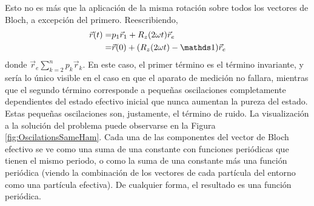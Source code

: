 Esto no es más que la aplicación de la misma rotación sobre todos los vectores de Bloch, a excepción del primero. Reescribiendo,
\begin{align*}
    \vec{r}(t)=&p_{1}\vec{r}_{1}+R_{z}(2\omega t)\vec{r}_{e}\\
    =&\vec{r}(0)+(R_{z}(2\omega t)-\Id)\vec{r}_{e}
\end{align*}
donde $\vec{r}_{e}\sum_{k=2}^{n}p_{k}\vec{r}_{k}$.
En este caso, el primer término es el término invariante, y sería lo único visible en el caso en que el aparato de medición no fallara, mientras que el segundo término corresponde a pequeñas oscilaciones completamente dependientes del estado efectivo inicial que nunca aumentan la pureza del estado. Estas pequeñas oscilaciones son, justamente, el término de ruido. La visualización a la solución del problema puede observarse en la Figura \ref{fig:OscilationsSameHam}. Cada una de las componentes del vector de Bloch efectivo se ve como una suma de una constante con funciones periódicas que tienen el mismo periodo, o  como la suma de una constante más una función periódica (viendo la combinación de los vectores de cada partícula del entorno como una partícula efectiva). De cualquier forma, el resultado es una función periódica.

